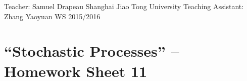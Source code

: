 \documentclass[DIV=classic,a4paper,10pt]{scrartcl}
\theoremstyle{nonumberplain}
\newtheorem{proof}{Proof}
\numberwithin{equation}{section}
\begin{document}
\noindent
Teacher: Samuel Drapeau \hfill Shanghai Jiao Tong University \newline
Teaching Assistant: Zhang Yaoyuan \hfill WS 2015/2016

\smallskip
\noindent
\hrulefill

\smallskip

\setcounter{section}{11}

\pagestyle{empty}


\section*{``Stochastic Processes'' -- Homework Sheet 11}
\thispagestyle{empty}





\end{document}
